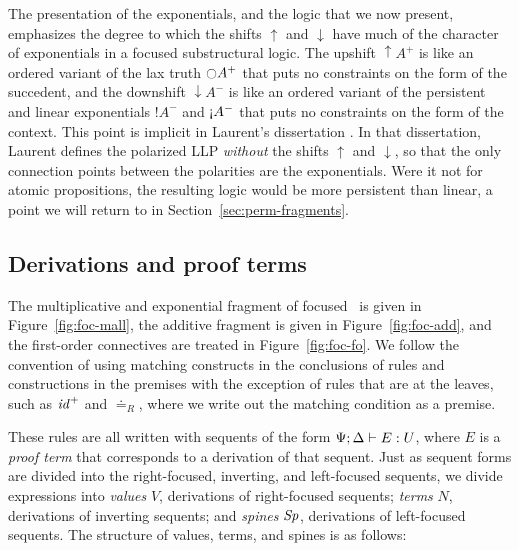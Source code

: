 The presentation of the exponentials, and the logic that we now
present, emphasizes the degree to which the shifts ${\uparrow}$ and
${\downarrow}$ have much of the character of exponentials in a focused
substructural logic. The upshift ${\uparrow}A^+$ is like an ordered
variant of the lax truth ${\ocircle}A^+$ that puts no constraints on
the form of the succedent, and the downshift ${\downarrow}A^-$ is
like an ordered variant of the persistent and linear exponentials
${!}A^-$ and ${\gnab}A^-$ that puts no constraints on the form of the
context. This point is implicit in Laurent's dissertation
\cite{laurent02etude}. In that dissertation, Laurent defines the polarized
LLP {\it without} the shifts ${\uparrow}$ and ${\downarrow}$, so that
the only connection points between the polarities are the
exponentials. Were it not for atomic propositions, the resulting logic
would be more persistent than linear,
a point we will return to in Section~\ref{sec:perm-fragments}.

\subsection{Derivations and proof terms}
\label{sec:ord-proof-terms}





The multiplicative and exponential fragment of focused \ollll~is given
in Figure~\ref{fig:foc-mall}, the additive fragment is given in
Figure~\ref{fig:foc-add}, and the first-order connectives are treated
in Figure~\ref{fig:foc-fo}. We follow the convention of using matching
constructs in the conclusions of rules and constructions in the premises
with the exception of rules that are at the leaves, such as 
${\it id}^+$ and ${\doteq}_R$, where we write out the matching
condition as a premise. 

These rules are all written with sequents
of the form ${\Psi}; {\Delta} \vdash {E} : {U}$, where $E$ is a {\it proof
  term} that corresponds to a derivation of that sequent. Just
as sequent forms are divided into the right-focused, inverting, and
left-focused sequents, we divide expressions into {\it values} $V$,
derivations of right-focused sequents; {\it terms} $N$,
derivations of inverting sequents; and {\it spines} ${\it Sp}$,
derivations of left-focused sequents. The structure of
values, terms, and spines is as follows:


